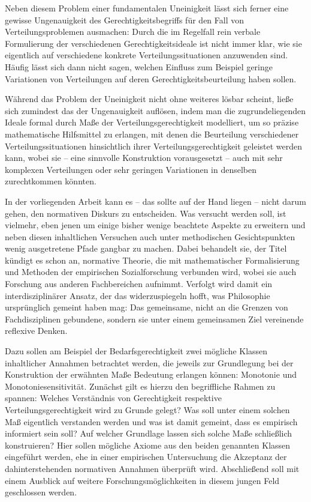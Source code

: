 \documentclass[a4paper]{thesis}
\begin{document}
Neben diesem Problem einer fundamentalen Uneinigkeit lässt sich ferner eine gewisse Ungenauigkeit des Gerechtigkeitsbegriffs für den Fall von Verteilungsproblemen ausmachen: Durch die im Regelfall rein verbale Formulierung der verschiedenen Gerechtigkeitsideale ist nicht immer klar, wie sie eigentlich auf verschiedene konkrete Verteilungssituationen anzuwenden sind. Häufig lässt sich dann nicht sagen, welchen Einfluss zum Beispiel geringe Variationen von Verteilungen auf deren Gerechtigkeitsbeurteilung haben sollen.

Während das Problem der Uneinigkeit nicht ohne weiteres lösbar scheint, ließe sich zumindest das der Ungenauigkeit auflösen, indem man die zugrundeliegenden Ideale formal durch Maße der Verteilungsgerechtigkeit modelliert, um so präzise mathematische Hilfsmittel zu erlangen, mit denen die Beurteilung verschiedener Verteilungssituationen hinsichtlich ihrer Verteilungsgerechtigkeit geleistet werden kann, wobei sie -- eine sinnvolle Konstruktion vorausgesetzt -- auch mit sehr komplexen Verteilungen oder sehr geringen Variationen in denselben zurechtkommen könnten.

In der vorliegenden Arbeit kann es -- das sollte auf der Hand liegen -- nicht darum gehen, den normativen Diskurs zu entscheiden. Was versucht werden soll, ist vielmehr, eben jenen um einige bisher wenige beachtete Aspekte zu erweitern und neben diesen inhaltlichen Versuchen auch unter methodischen Gesichtspunkten wenig ausgetretene Pfade gangbar zu machen. Dabei behandelt sie, der Titel kündigt es schon an, normative Theorie, die mit mathematischer Formalisierung und Methoden der empirischen Sozialforschung verbunden wird, wobei sie auch Forschung aus anderen Fachbereichen aufnimmt. Verfolgt wird damit ein interdisziplinärer Ansatz, der das widerzuspiegeln hofft, was Philosophie ursprünglich gemeint haben mag: Das gemeinsame, nicht an die Grenzen von Fachdisziplinen gebundene, sondern sie unter einem gemeinsamen Ziel vereinende reflexive Denken.

Dazu sollen am Beispiel der Bedarfsgerechtigkeit zwei mögliche Klassen inhaltlicher Annahmen betrachtet werden, die jeweils zur Grundlegung bei der Konstruktion der erwähnten Maße Bedeutung erlangen können: Monotonie und Monotoniesensitivität. Zunächst gilt es hierzu den begriffliche Rahmen zu spannen: Welches Verständnis von Gerechtigkeit respektive Verteilungsgerechtigkeit wird zu Grunde gelegt? Was soll unter einem solchen Maß eigentlich verstanden werden und was ist damit gemeint, dass es empirisch informiert sein soll? Auf welcher Grundlage lassen sich solche Maße schließlich konstruieren? Hier sollen mögliche Axiome aus den beiden genannten Klassen eingeführt werden, ehe in einer empirischen Untersuchung die Akzeptanz der dahinterstehenden normativen Annahmen überprüft wird. Abschließend soll mit einem Ausblick auf weitere Forschungsmöglichkeiten in diesem jungen Feld geschlossen werden.
\end{document}
